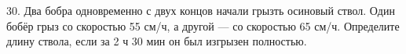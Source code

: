 30. Два бобра одновременно с двух концов начали грызть осиновый ствол. Один бобёр грыз со скоростью 55 см/ч, а другой --- со скоростью 65 см/ч. Определите длину ствола, если за 2 ч 30 мин он был изгрызен полностью.\\
